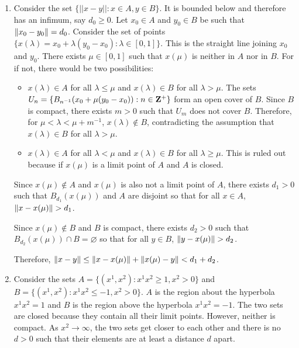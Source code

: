 \begin{enumerate}
\begin{enumerate}
\item Consider the set $\{||x - y|| : x \in A, y \in B\}$. It is bounded below
and therefore has an infimum, say $d_0 \ge 0$. Let $x_0 \in A$ and $y_0 \in B$
be such that $\left\Vert{x_0 - y_0}\right\Vert = d_0$. Consider the set of points $\{x(\lambda)
= x_0 + \lambda(y_0 - x_0) : \lambda \in [0, 1]\}$. This is the straight line 
joining $x_0$ and $y_0$. There exists $\mu \in [0, 1]$ such that $x(\mu)$
is neither in $A$ nor in $B$. For if not, there would be two possibilities:
\begin{itemize}
\item $x(\lambda) \in A$ for all $\lambda \le \mu$ and $x(\lambda) \in B$ for
all $\lambda > \mu$. The sets $U_n = \{B_{n^{-1}}(x_0 + \mu(y_0 - x_0)) : n 
\in \mathbf{Z}^+\}$ form an open cover of $B$. Since $B$ is compact, there exists 
$m > 0$ such that $U_m$ does not cover $B$. Therefore, for $\mu < \lambda < 
\mu + m^{-1}$, $x(\lambda) \notin B$, contradicting the assumption that $
x(\lambda) \in B$ for all $\lambda > \mu$.

\item $x(\lambda) \in A$ for all $\lambda < \mu$ and $x(\lambda) \in B$ for
all $\lambda \ge \mu$. This is ruled out because if $x(\mu)$ is a limit point
of $A$ and $A$ is closed.
\end{itemize}

Since $x(\mu) \notin A$ and $x(\mu)$ is also not a limit point of $A$, there 
exists $d_1 > 0$ such that $B_{d_1}(x(\mu))$ and $A$ are disjoint so that for 
all $x \in A$, $\left\Vert{x - x(\mu)}\right\Vert > d_1$. 

Since $x(\mu) \notin B$ and $B$ is compact, there exists $d_2 > 0$ such that
$B_{d_2}(x(\mu)) \cap B = \varnothing$ so that for all $y \in B$, $\left\Vert{y -
x(\mu)}\right\Vert > d_2$.

Therefore, $\left\Vert{x - y}\right\Vert \le \left\Vert{x - x(\mu)}\right\Vert + \left\Vert{x(\mu) - y}\right\Vert < d_1+d_2$.

\item Consider the sets $A = \{(x^1, x^2) : x^1 x^2 \ge 1, x^2 > 0\}$ and $B = 
\{(x^1, x^2) : x^1 x^2 \le -1, x^2 > 0\}$. $A$ is the region about the hyperbola
$x^1x^2 = 1$ and $B$ is the region above the hyperbola $x^1x^2 = -1$. The two
sets are closed because they contain all their limit points. However, neither
is compact. As $x^2 \rightarrow \infty$, the two sets get closer to each other
and there is no $d > 0$ such that their elements are at least a distance $d$
apart.
\end{enumerate}

\end{enumerate}
